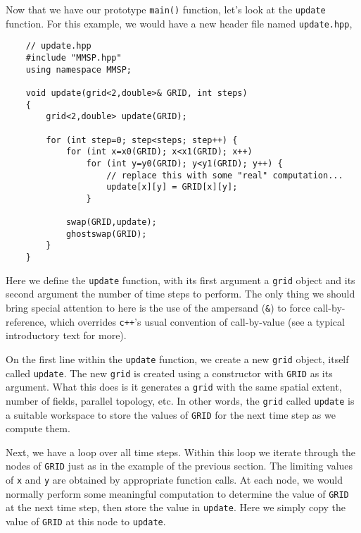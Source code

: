 Now that we have our prototype {\tt main()} function, let's look at the {\tt update} function.  For this example, we would have a new header file named {\tt update.hpp},
\begin{shadebox}
\begin{verbatim}
    // update.hpp
    #include "MMSP.hpp"
    using namespace MMSP;

    void update(grid<2,double>& GRID, int steps)
    {
        grid<2,double> update(GRID);

        for (int step=0; step<steps; step++) {
            for (int x=x0(GRID); x<x1(GRID); x++)
                for (int y=y0(GRID); y<y1(GRID); y++) {
                    // replace this with some "real" computation...
                    update[x][y] = GRID[x][y];
                }

            swap(GRID,update);
            ghostswap(GRID);
        }
    }
\end{verbatim}
\end{shadebox}
Here we define the {\tt update} function, with its first argument a {\tt grid} object and its second argument the number of time steps to perform.  The only thing we should bring special attention to here is the use of the ampersand ({\tt \&}) to force call-by-reference, which overrides {\tt c++}'s usual convention of call-by-value (see a typical introductory text for more).

On the first line within the {\tt update} function, we create a new {\tt grid} object, itself called {\tt update}.  The new {\tt grid} is created using a constructor with {\tt GRID} as its argument.  What this does is it generates a {\tt grid} with the same spatial extent, number of fields, parallel topology, etc.  In other words, the {\tt grid} called {\tt update} is a suitable workspace to store the values of {\tt GRID} for the next time step as we compute them.

Next, we have a loop over all time steps.  Within this loop we iterate through the nodes of {\tt GRID} just as in the example of the previous section.  The limiting values of {\tt x} and {\tt y} are obtained by appropriate function calls.  At each node, we would normally perform some meaningful computation to determine the value of {\tt GRID} at the next time step, then store the value in {\tt update}.  Here we simply copy the value of {\tt GRID} at this node to {\tt update}.


